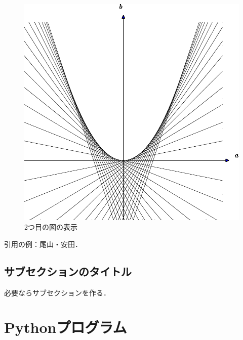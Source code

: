 \documentclass[11pt,a4j,fleqn]{jarticle}
\begin{document}
\begin{figure}
 \centering
 \includegraphics{envelope1.pdf}
 \caption{2つ目の図の表示}
 \label{fig:2}
\end{figure}



引用の例：尾山・安田\cite{OyamaYasuda11}．


\subsection{サブセクションのタイトル}

必要ならサブセクションを作る．


\newpage
\section{Pythonプログラム}
\end{document}
